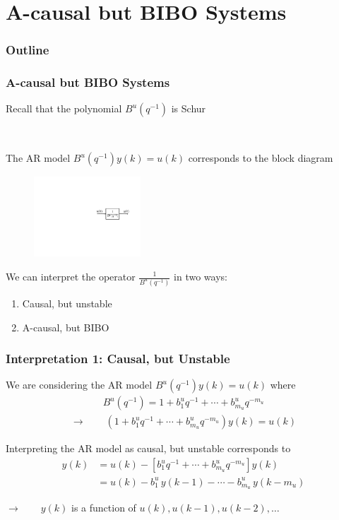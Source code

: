 \section{A-causal but BIBO Systems}
\begin{frame}
    \frametitle{Outline}
    \tableofcontents[currentsection]
\end{frame}

\begin{frame}
    \frametitle{A-causal but BIBO Systems}

    Recall that the polynomial $B^u(q^{-1})$ is Schur
    \pause

    $\,$

    The AR model $B^u(q^{-1}) y(k) = u(k)$ corresponds to the block diagram
    \begin{figure}
        \includegraphics[width=4cm]{MVR_figs_ac1}
    \end{figure}
    \pause


    We can interpret the operator $\displaystyle{ \frac{1}{B^u(q^{-1})} }$ in two ways:
    \pause
    \begin{enumerate}
        \item
        Causal, but unstable
        \pause

        \item
        A-causal, but BIBO
    \end{enumerate}
\end{frame}

\begin{frame}
    \frametitle{Interpretation 1: Causal, but Unstable}

    We are considering the AR model $B^u(q^{-1}) y(k) = u(k)$ where
    \begin{align*}
        B^u(q^{-1}) = 1 + b_1^u q^{-1} + \cdots + b_{m_u}^u q^{-m_u}
    \end{align*}
    \paused
    \begin{align*}
        \longrightarrow \qquad (1 + b_1^u q^{-1} + \cdots + b_{m_u}^u q^{-m_u}) y(k) = u(k)
    \end{align*}
    \pause

    Interpreting the AR model as causal, but unstable corresponds to
    \begin{align*}
        y(k) & = u(k) - [b_1^u q^{-1} + \cdots + b_{m_u}^u q^{-m_u}] y(k) \\
        & = u(k) - b_1^u \, y(k-1) - \cdots - b_{m_u}^u \, y(k-m_u)
    \end{align*}
    \paused

    $\longrightarrow \qquad y(k)$ is a function of $u(k),u(k-1),u(k-2),\ldots$
\end{frame}

